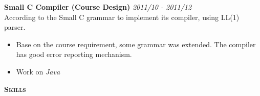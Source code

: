 \documentclass[a4paper]{article}
\newenvironment{changemargin}[2]{%
  \begin{list}{}{%
    \setlength{\topsep}{0pt}%
    \setlength{\leftmargin}{#1}%
    \setlength{\rightmargin}{#2}%
    \setlength{\listparindent}{\parindent}%
    \setlength{\itemindent}{\parindent}%
    \setlength{\parsep}{\parskip}%
  }%
  \item[]}{\end{list}
}
\newcommand{\lineover}{
	\begin{changemargin}{-0.05in}{-0.05in}
		\vspace*{-8pt}
		\hrulefill \\
		\vspace*{-2pt}
	\end{changemargin}
}
\newcommand{\header}[1]{
	\begin{changemargin}{-0.5in}{-0.5in}
		\scshape{\textbf{#1}}\\
	\end{changemargin}
}
\newenvironment{body} {
	\vspace*{-16pt}
	\begin{changemargin}{-0.25in}{-0.5in}
  }	
	{\end{changemargin}
}
\begin{document}
\begin{body}
	{\textbf{Small C Compiler (Course Design)}} \hfill \emph{2011/10 - 2011/12}\\
	According to the Small C grammar to implement its compiler, using LL(1) parser.\\
	\vspace*{-6pt}
	\begin{itemize} \itemsep -0pt  %
		\item Base on the course requirement, some grammar was extended. The compiler has  good error reporting mechanism.\\
	\end{itemize}
	\vspace*{-12pt}
	\begin{itemize} \itemsep -0pt  %
		\item Work on \emph{Java}
	\end{itemize}
	
\end{body}

\medskip

\header{Skills}
\end{document}
